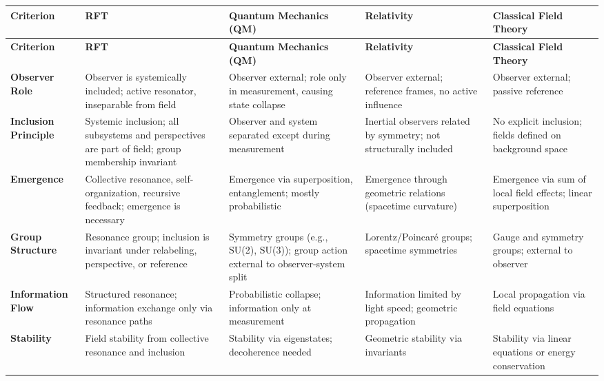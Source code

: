 \documentclass[12pt]{article}
\begin{document}
\renewcommand{\arraystretch}{1.3}
\begin{center}
	\begin{longtable}{|p{4cm}|p{3cm}|p{3cm}|p{3cm}|p{3cm}|}
		\hline
		\textbf{Criterion} & \textbf{RFT} & \textbf{Quantum Mechanics (QM)} & \textbf{Relativity} & \textbf{Classical Field Theory} \\
		\hline
		\endfirsthead
		
		\hline
		\textbf{Criterion} & \textbf{RFT} & \textbf{Quantum Mechanics (QM)} & \textbf{Relativity} & \textbf{Classical Field Theory} \\
		\hline
		\endhead
		
		\hline
		\endfoot
		
		\hline
		\endlastfoot
		
		\textbf{Observer Role} & Observer is systemically included; active resonator, inseparable from field & Observer external; role only in measurement, causing state collapse & Observer external; reference frames, no active influence & Observer external; passive reference \\
		\hline
		\textbf{Inclusion Principle} & Systemic inclusion; all subsystems and perspectives are part of field; group membership invariant & Observer and system separated except during measurement & Inertial observers related by symmetry; not structurally included & No explicit inclusion; fields defined on background space \\
		\hline
		\textbf{Emergence} & Collective resonance, self-organization, recursive feedback; emergence is necessary & Emergence via superposition, entanglement; mostly probabilistic & Emergence through geometric relations (spacetime curvature) & Emergence via sum of local field effects; linear superposition \\
		\hline
		\textbf{Group Structure} & Resonance group; inclusion is invariant under relabeling, perspective, or reference & Symmetry groups (e.g., SU(2), SU(3)); group action external to observer-system split & Lorentz/Poincaré groups; spacetime symmetries & Gauge and symmetry groups; external to observer \\
		\hline
		\textbf{Information Flow} & Structured resonance; information exchange only via resonance paths & Probabilistic collapse; information only at measurement & Information limited by light speed; geometric propagation & Local propagation via field equations \\
		\hline
		\textbf{Stability} & Field stability from collective resonance and inclusion & Stability via eigenstates; decoherence needed & Geometric stability via invariants & Stability via linear equations or energy conservation \\

\end{longtable}
\end{center}
\end{document}

